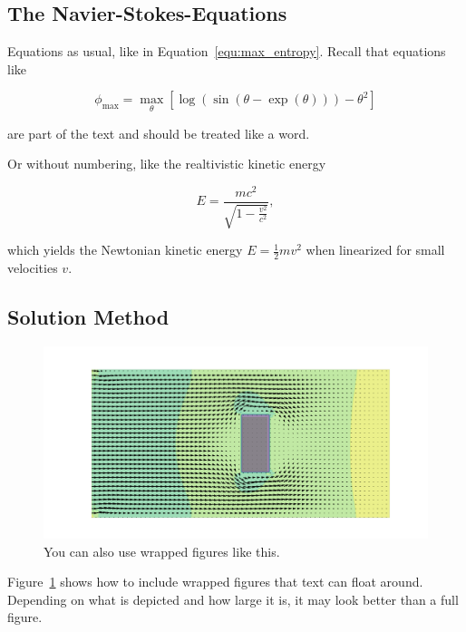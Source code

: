 \documentclass[11pt,table]{article}
\begin{document}
\subsection{The Navier-Stokes-Equations}

Equations as usual, like in Equation~\ref{equ:max_entropy}. Recall that equations like

\begin{equation}\label{equ:max_entropy}
	\phi_\mathrm{max} = \max_{\theta} \left[ \log(\sin(\theta - \exp(\theta))) - \theta^2 \right]
\end{equation}

are part of the text and should be treated like a word.


Or without numbering, like the realtivistic kinetic energy 

\begin{equation*}
	E = \frac{mc^2}{\sqrt{1 - \frac{v^2}{c^2}}},
\end{equation*}

which yields the Newtonian kinetic energy $E = \frac 1 2 m v^2$ when linearized for small velocities $v$.

\subsection{Solution Method}
\begin{figure}
	\centering
	\includegraphics[scale=1.0]{Figures/example_cover.png}
	\caption{You can also use wrapped figures like this.}
	\label{fig:wrapfigure_example}
\end{figure}
Figure~\ref{fig:wrapfigure_example} shows how to include wrapped figures that text can float around. Depending on what is depicted and how large it is, it may look better than a full figure.
\end{document}
